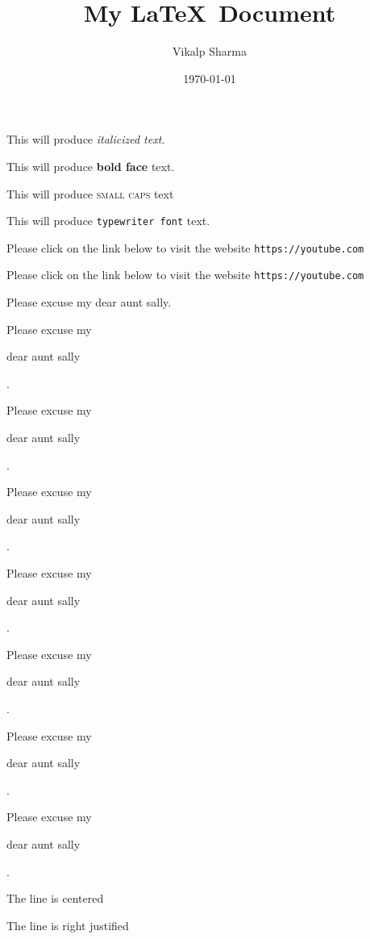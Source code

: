 \documentclass[11pt]{article}
\title{My \LaTeX\, Document}
\author{Vikalp Sharma}
\date{\today}
\begin{document}
\tableofcontents
\maketitle


This will produce \it{italicized} text.

This will produce \textbf{bold face} text.

This will produce \textsc{small caps} text

This will produce \texttt{typewriter font} text.

Please click on the link below to visit the website \texttt{https://youtube.com}

Please click on the link below to visit the website \texttt{https://youtube.com}

\vspace{1cm}

Please excuse my dear aunt sally.

Please excuse my \begin{large}dear aunt sally\end{large}.

Please excuse my \begin{Large}dear aunt sally\end{Large}.

Please excuse my \begin{huge}dear aunt sally\end{huge}.

Please excuse my \begin{Huge}dear aunt sally\end{Huge}.

Please excuse my \begin{small}dear aunt sally\end{small}.

Please excuse my \begin{scriptsize}dear aunt sally\end{scriptsize}.

Please excuse my \begin{tiny}dear aunt sally\end{tiny}.

\vspace{1cm}

\begin{center}
The line is centered
\end{center}

\begin{flushright}
The line is right justified
\end{flushright}
\end{document}
